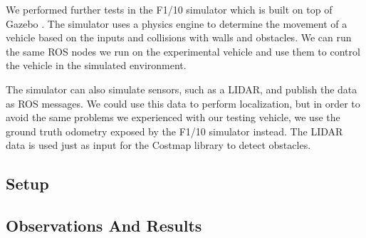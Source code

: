 We performed further tests in the F1/10 simulator \cite{varundev_ros_19} which is built on top of Gazebo \cite{gazebo}. The simulator uses a physics engine to determine the movement of a vehicle based on the inputs and collisions with walls and obstacles. We can run the same \gls*{ROS} nodes we run on the experimental vehicle and use them to control the vehicle in the simulated environment.

The simulator can also simulate sensors, such as a \gls*{LIDAR}, and publish the data as \gls*{ROS} messages. We could use this data to perform localization, but in order to avoid the same problems we experienced with our testing vehicle, we use the ground truth odometry exposed by the F1/10 simulator instead. The \gls*{LIDAR} data is used just as input for the Costmap library to detect obstacles.

\subsection{Setup}

\subsection{Observations And Results}
